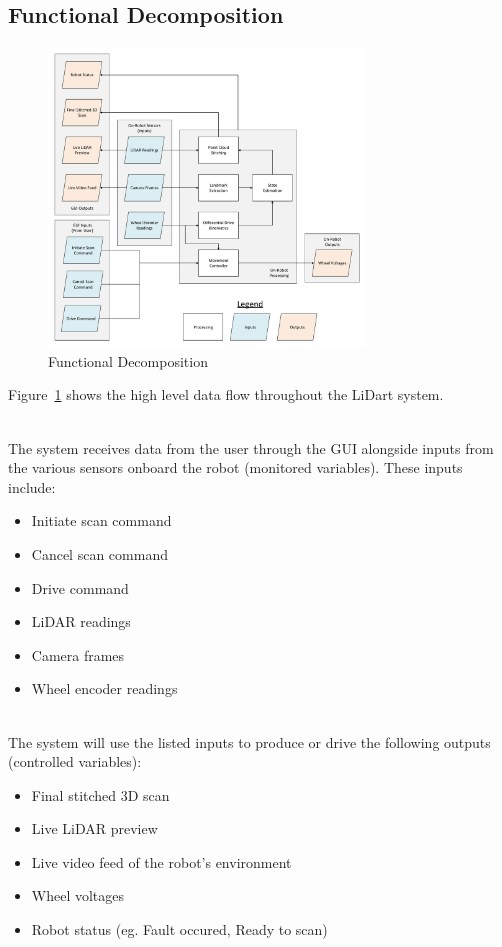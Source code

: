 \documentclass[12pt]{article}
\begin{document}
\subsection{Functional Decomposition}

\begin{figure}[H]
\begin{center}
    \includegraphics[width=0.75\textwidth]{Figures/Functional Decomposition.pdf}
\caption{Functional Decomposition}
\label{Fig_FunctionalDecomposition} 
\end{center}
\end{figure}

Figure~\ref{Fig_FunctionalDecomposition} shows the high level data flow throughout the LiDart system. 

\ \\
The system receives data from the user through the GUI alongside inputs from the various sensors onboard the robot (monitored variables). These inputs include:
\begin{itemize}
\item Initiate scan command
\item Cancel scan command
\item Drive command
\item LiDAR readings
\item Camera frames
\item Wheel encoder readings
\end{itemize}

\ \\
The system will use the listed inputs to produce or drive the following outputs (controlled variables):
\begin{itemize}
\item Final stitched 3D scan
\item Live LiDAR preview
\item Live video feed of the robot's environment
\item Wheel voltages
\item Robot status (eg. Fault occured, Ready to scan) 
\end{itemize}
\end{document}
